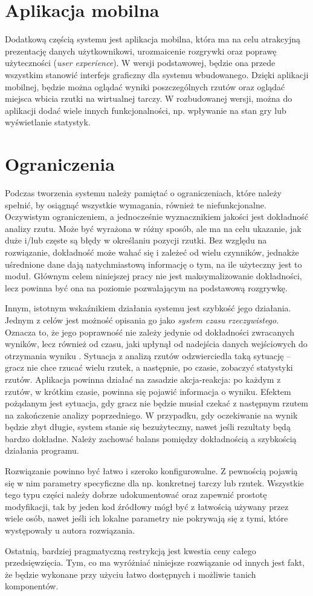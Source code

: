 \section{Aplikacja mobilna}
Dodatkową częścią systemu jest aplikacja mobilna, która ma na celu atrakcyjną prezentację danych użytkownikowi, urozmaicenie rozgrywki oraz poprawę użyteczności (\textit{user experience}). W wersji podstawowej, będzie ona przede wszystkim stanowić interfejs graficzny dla systemu wbudowanego. Dzięki aplikacji mobilnej, będzie można oglądać wyniki poszczególnych rzutów oraz oglądać miejsca wbicia rzutki na wirtualnej tarczy. W rozbudowanej wersji, można do aplikacji dodać wiele innych funkcjonalności, np. wpływanie na stan gry lub wyświetlanie statystyk. 
 
\section{Ograniczenia}
Podczas tworzenia systemu należy pamiętać o ograniczeniach, które należy spełnić, by osiągnąć wszystkie wymagania, również te niefunkcjonalne. Oczywistym ograniczeniem, a jednocześnie wyznacznikiem jakości jest dokładność analizy rzutu. Może być wyrażona w różny sposób, ale ma na celu ukazanie, jak duże i/lub częste są błędy w określaniu pozycji rzutki. Bez względu na rozwiązanie, dokładność może wahać się i zależeć od wielu czynników, jednakże uśrednione dane dają natychmiastową informację o tym, na ile użyteczny jest to moduł. Głównym celem niniejszej pracy nie jest maksymalizowanie dokładności, lecz powinna być ona na poziomie pozwalającym na podstawową rozgrywkę.  

Innym, istotnym wskaźnikiem działania systemu jest szybkość jego działania. Jednym z celów jest możność opisania go jako \textit{system czasu rzeczywistego}. Oznacza to, że jego poprawność nie zależy jedynie od dokładności zwracanych wyników, lecz również od czasu, jaki upłynął od nadejścia danych wejściowych do otrzymania wyniku \cite{Realtime}. Sytuacja z analizą rzutów odzwierciedla taką sytuację -- gracz nie chce rzucać wielu rzutek, a następnie, po czasie, zobaczyć statystyki rzutów. Aplikacja powinna działać na zasadzie akcja-reakcja: po każdym z rzutów, w krótkim czasie, powinna się pojawić informacja o wyniku. Efektem pożądanym jest sytuacja, gdy gracz nie będzie musiał czekać z następnym rzutem na zakończenie analizy poprzedniego. W przypadku, gdy oczekiwanie na wynik będzie zbyt długie, system stanie się bezużyteczny, nawet jeśli rezultaty będą bardzo dokładne. Należy zachować balans pomiędzy dokładnością a szybkością działania programu.

Rozwiązanie powinno być łatwo i szeroko konfigurowalne. Z pewnością pojawią się w nim parametry specyficzne dla np. konkretnej tarczy lub rzutek. Wszystkie tego typu części należy dobrze udokumentować oraz zapewnić prostotę modyfikacji, tak by jeden kod źródłowy mógł być z łatwością używany przez wiele osób, nawet jeśli ich lokalne parametry nie pokrywają się z tymi, które występowały u autora rozwiązania. 

Ostatnią, bardziej pragmatyczną restrykcją jest kwestia ceny całego przedsięwzięcia. Tym, co ma wyróżniać niniejsze rozwiązanie od innych jest fakt, że będzie wykonane przy użyciu łatwo dostępnych i możliwie tanich komponentów.